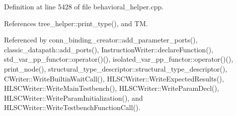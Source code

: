 Definition at line 5428 of file behavioral\+\_\+helper.\+cpp.



References tree\+\_\+helper\+::print\+\_\+type(), and TM.



Referenced by conn\+\_\+binding\+\_\+creator\+::add\+\_\+parameter\+\_\+ports(), classic\+\_\+datapath\+::add\+\_\+ports(), Instruction\+Writer\+::declare\+Function(), std\+\_\+var\+\_\+pp\+\_\+functor\+::operator()(), isolated\+\_\+var\+\_\+pp\+\_\+functor\+::operator()(), print\+\_\+node(), structural\+\_\+type\+\_\+descriptor\+::structural\+\_\+type\+\_\+descriptor(), C\+Writer\+::\+Write\+Builtin\+Wait\+Call(), H\+L\+S\+C\+Writer\+::\+Write\+Expected\+Results(), H\+L\+S\+C\+Writer\+::\+Write\+Main\+Testbench(), H\+L\+S\+C\+Writer\+::\+Write\+Param\+Decl(), H\+L\+S\+C\+Writer\+::\+Write\+Param\+Initialization(), and H\+L\+S\+C\+Writer\+::\+Write\+Testbench\+Function\+Call().


